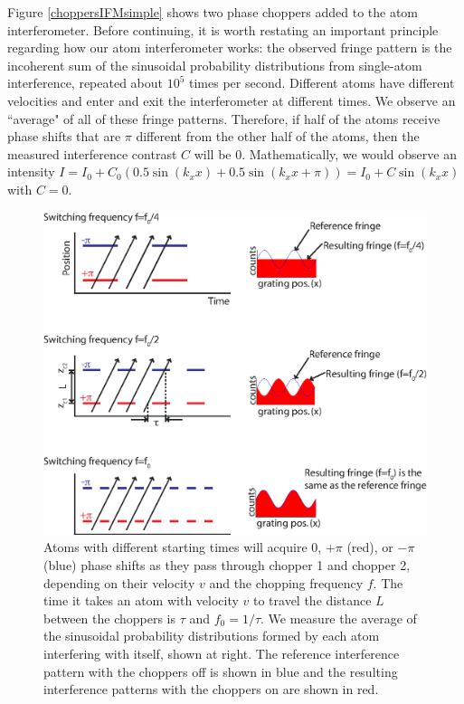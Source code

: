 Figure \ref{choppersIFMsimple} shows two phase choppers added to the atom interferometer. Before continuing, it is worth restating an important principle regarding how our atom interferometer works: the observed fringe pattern is the incoherent sum of the sinusoidal probability distributions from single-atom interference, repeated about $10^5$ times per second. Different atoms have different velocities and enter and exit the interferometer at different times. We observe an ``average" of all of these fringe patterns. Therefore, if half of the atoms receive phase shifts that are $\pi$ different from the other half of the atoms, then the measured interference contrast $C$ will be 0. Mathematically, we would observe an intensity $I=I_0 + C_0(0.5\sin(k_x x)+0.5\sin(k_x x+\pi))=I_0+C\sin(k_x x)$ with $C=0$. 

\begin{figure}
\includegraphics[width=1\textwidth]{Figures/PhaseChoppersVvst4.eps}
\caption[Interferometer contrast for particular chopping frequencies.]{\label{VvsT}Atoms with different starting times will acquire 0, $+\pi$ (red), or $-\pi$ (blue) phase shifts as they pass through chopper 1 and chopper 2, depending on their velocity $v$ and the chopping frequency $f$. The time it takes an atom with velocity $v$ to travel the distance $L$ between the choppers is $\tau$ and $f_0=1/\tau$. We measure the average of the sinusoidal probability distributions formed by each atom interfering with itself, shown at right. The reference interference pattern with the choppers off is shown in blue and the resulting interference patterns with the choppers on are shown in red.}
\end{figure}

